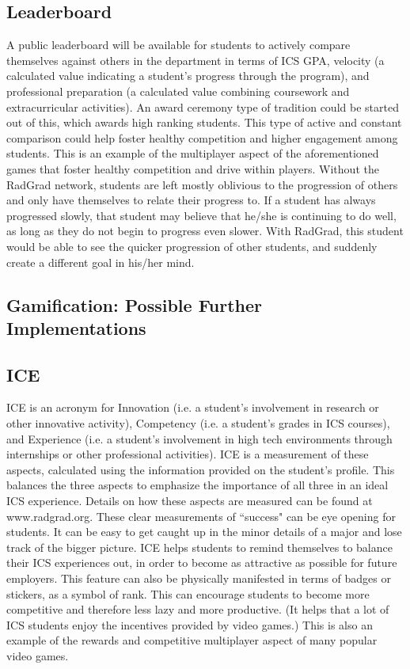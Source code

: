 \subsection{Leaderboard}
A public leaderboard will be available for students to actively compare themselves against others in the department in terms of ICS GPA, velocity (a calculated value indicating a student's progress through the program), and professional preparation (a calculated value combining coursework and extracurricular activities). An award ceremony type of tradition could be started out of this, which awards high ranking students. This type of active and constant comparison could help foster healthy competition and higher engagement among students. This is an example of the multiplayer aspect of the aforementioned games that foster healthy competition and drive within players. Without the RadGrad network, students are left mostly oblivious to the progression of others and only have themselves to relate their progress to. If a student has always progressed slowly, that student may believe that he/she is continuing to do well, as long as they do not begin to progress even slower. With RadGrad, this student would be able to see the quicker progression of other students, and suddenly create a different goal in his/her mind.

\subsection{Gamification: Possible Further Implementations}

\subsection{ICE}
ICE is an acronym for Innovation (i.e. a student's involvement in research or other innovative activity), Competency (i.e. a student's grades in ICS courses), and Experience (i.e. a student's involvement in high tech environments through internships or other professional activities). ICE is a measurement of these aspects, calculated using the information provided on the student's profile. This balances the three aspects to emphasize the importance of all three in an ideal ICS experience. Details on how these aspects are measured can be found at www.radgrad.org. These clear measurements of ``success" can be eye opening for students. It can be easy to get caught up in the minor details of a major and lose track of the bigger picture. ICE helps students to remind themselves to balance their ICS experiences out, in order to become as attractive as possible for future employers. This feature can also be physically manifested in terms of badges or stickers, as a symbol of rank. This can encourage students to become more competitive and therefore less lazy and more productive. (It helps that a lot of ICS students enjoy the incentives provided by video games.) This is also an example of the rewards and competitive multiplayer aspect of many popular video games. 




